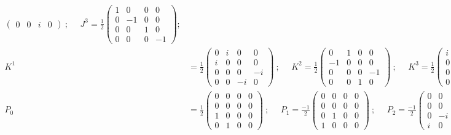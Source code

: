 \documentclass[]{article}
\numberwithin{equation}{section}
\begin{document}
{{\begin{align*}
\begin{pmatrix}
    0&0&i&0
    \end{pmatrix}~;~~~~~~J^{3}=\frac{1}{2}\begin{pmatrix}
    1&0&0&0\\
    0&-1&0&0\\
    0&0&1&0\\
    0&0&0&-1
    \end{pmatrix};\\
    K^{1}&=\frac{1}{2}\begin{pmatrix}
    0&i&0&0\\
    i&0&0&0\\
    0&0&0&-i\\
    0&0&-i&0
    \end{pmatrix}~;~~~~~~K^{2}=\frac{1}{2}\begin{pmatrix}
    0&1&0&0\\
    -1&0&0&0\\
    0&0&0&-1\\
    0&0&1&0
    \end{pmatrix}~;~~~~~~K^{3}=\frac{1}{2}\begin{pmatrix}
    i&0&0&0\\
    0&-i&0&0\\
    0&0&-i&0\\
    0&0&0&i
    \end{pmatrix};\\
    P_0&=\frac{1}{2}\begin{pmatrix}
    0&0&0&0\\
    0&0&0&0\\
    1&0&0&0\\
    0&1&0&0
    \end{pmatrix}~;~~~~~~P_1=\frac{-1}{2}\begin{pmatrix}
    0&0&0&0\\
    0&0&0&0\\
    0&1&0&0\\
    1&0&0&0
    \end{pmatrix}~;~~~~~~P_2=\frac{-1}{2}\begin{pmatrix}
    0&0&0&0\\
    0&0&0&0\\
    0&-i&0&0\\
    i&0&0&0
    \end{pmatrix}~;~~~~~~P_3=\frac{-1}{2}\begin{pmatrix}
    0&0&0&0\\
    0&0&0&0\\
    1&0&0&0\\
    0&-1&0&0
    \end{pmatrix}\\

\end{align*}}}
\end{document}

